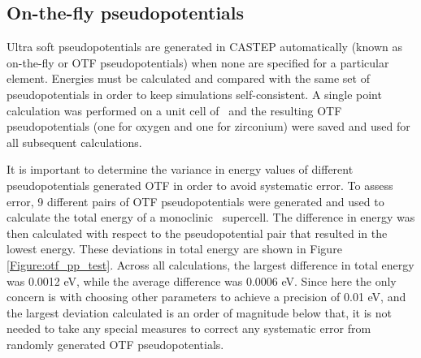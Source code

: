 \subsection{On-the-fly pseudopotentials}

Ultra soft pseudopotentials are generated in CASTEP automatically (known as on-the-fly or OTF pseudopotentials) when none are specified for a particular element. Energies must be calculated and compared with the same set of pseudopotentials in order to keep simulations self-consistent. A single point calculation was performed on a unit cell of \zirconia\ and the resulting OTF pseudopotentials (one for oxygen and one for zirconium) were saved and used for all subsequent calculations. 

It is important to determine the variance in energy values of different pseudopotentials generated OTF in order to avoid systematic error. To assess error, 9 different pairs of OTF pseudopotentials were generated and used to calculate the total energy of a monoclinic \zirconia\ supercell. The difference in energy was then calculated with respect to the pseudopotential pair that resulted in the lowest energy. These deviations in total energy are shown in Figure \ref{Figure:otf_pp_test}. Across all calculations, the largest difference in total energy was 0.0012 eV, while the average difference was 0.0006 eV. Since here the only concern is with choosing other parameters to achieve a precision of 0.01 eV, and the largest deviation calculated is an order of magnitude below that, it is not needed to take any special measures to correct any systematic error from randomly generated OTF pseudopotentials.


